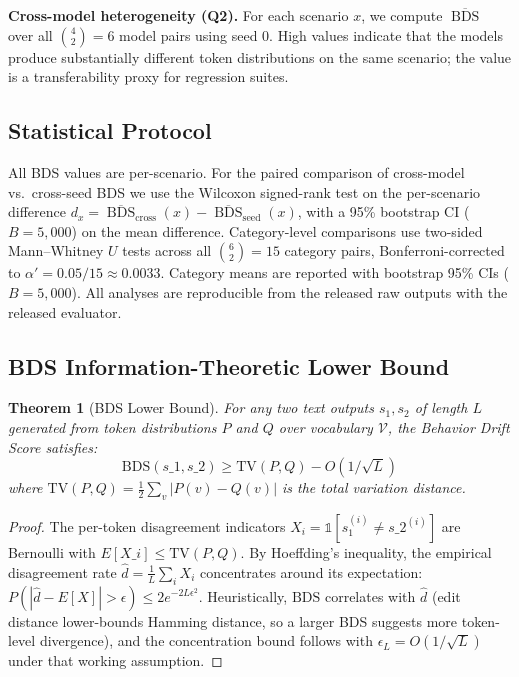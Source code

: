 \documentclass[11pt]{article}
\DeclareMathOperator{\BDS}{BDS}
\newtheorem{theorem}{Theorem}
\begin{document}
\textbf{Cross-model heterogeneity (Q2).} For each scenario $x$, we compute
$\overline{\BDS}$ over all $\binom{4}{2} = 6$ model pairs using seed 0.
High values indicate that the models produce substantially different token
distributions on the same scenario; the value is a transferability proxy
for regression suites.

\subsection{Statistical Protocol}

All BDS values are per-scenario. For the paired comparison of cross-model
vs.\ cross-seed BDS we use the Wilcoxon signed-rank test on the
per-scenario difference $d_x = \overline{\BDS}_{\text{cross}}(x) - \overline{\BDS}_{\text{seed}}(x)$,
with a 95\% bootstrap CI ($B = 5{,}000$) on the mean difference.
Category-level comparisons use two-sided Mann--Whitney $U$ tests across
all $\binom{6}{2} = 15$ category pairs, Bonferroni-corrected to
$\alpha' = 0.05/15 \approx 0.0033$. Category means are reported with
bootstrap 95\% CIs ($B = 5{,}000$). All analyses are reproducible from the
released raw outputs with the released evaluator.

\subsection{BDS Information-Theoretic Lower Bound}

\begin{theorem}[BDS Lower Bound]
\label{thm:bds-bound}
For any two text outputs $s_1, s_2$ of length $L$ generated from token
distributions $P$ and $Q$ over vocabulary $\mathcal{V}$, the Behavior
Drift Score satisfies:
\begin{equation}
\mathrm{BDS}(s\_1, s\_2) \geq \mathrm{TV}(P, Q) - O(1/\sqrt{L})
\end{equation}
where $\mathrm{TV}(P, Q) = \frac{1}{2}\sum_{v} |P(v) - Q(v)|$ is the
total variation distance.
\end{theorem}

\begin{proof}
The per-token disagreement indicators $X_i = \mathbb{1}[s_1^{(i)} \neq
s\_2^{(i)}]$ are Bernoulli with $E[X\_i] \leq \mathrm{TV}(P, Q)$. By
Hoeffding's inequality, the empirical disagreement rate
$\hat{d} = \frac{1}{L}\sum_i X_i$ concentrates around its expectation:
$P(|\hat{d} - E[X]| > \epsilon) \leq 2e^{-2L\epsilon^2}$. Heuristically,
$\mathrm{BDS}$ correlates with $\hat{d}$ (edit distance lower-bounds Hamming
distance, so a larger BDS suggests more token-level divergence), and the
concentration bound follows with $\epsilon_L = O(1/\sqrt{L})$ under that
working assumption.
\end{proof}
\end{document}
